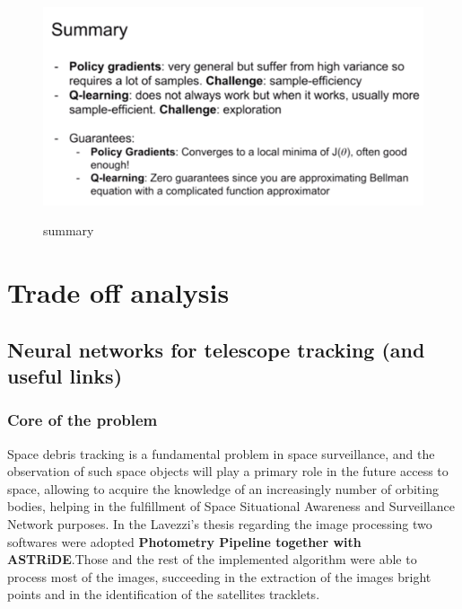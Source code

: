 \documentclass[11pt]{article}
\begin{document}
\begin{figure}[h]
\centering
\captionsetup{justification=centering}
\includegraphics[width=0.7\linewidth]{L1329.pdf}
\label{fig:1329}
\caption{ summary}
\end{figure}
\clearpage
\section{Trade off analysis}
\subsection{  Neural networks for telescope tracking (and useful links)}
\subsubsection{Core of the problem}
Space debris tracking is a fundamental problem in space surveillance, and the observation
of such space objects will play a primary role in the future access to
space, allowing to acquire the knowledge of an increasingly number of orbiting
bodies, helping in the fulfillment of Space Situational Awareness and Surveillance Network purposes. In the Lavezzi's thesis regarding the image processing two softwares were adopted \textbf{Photometry Pipeline together with ASTRiDE}.Those and
the rest of the implemented algorithm were able to process most of the images,
succeeding in the extraction of the images bright points and in the identification of the satellites tracklets.
\end{document}
